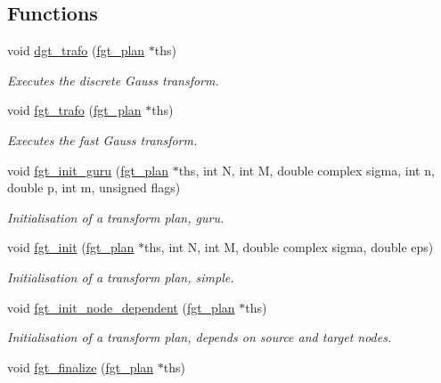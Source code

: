 \subsection*{Functions}
\begin{CompactItemize}
\item 
void \hyperlink{group__applications__fastgauss_ga0}{dgt\_\-trafo} (\hyperlink{structfgt__plan}{fgt\_\-plan} $\ast$ths)
\begin{CompactList}\small\item\em Executes the discrete Gauss transform. \item\end{CompactList}\item 
void \hyperlink{group__applications__fastgauss_ga1}{fgt\_\-trafo} (\hyperlink{structfgt__plan}{fgt\_\-plan} $\ast$ths)
\begin{CompactList}\small\item\em Executes the fast Gauss transform. \item\end{CompactList}\item 
void \hyperlink{group__applications__fastgauss_ga2}{fgt\_\-init\_\-guru} (\hyperlink{structfgt__plan}{fgt\_\-plan} $\ast$ths, int N, int M, double complex sigma, int n, double p, int m, unsigned flags)
\begin{CompactList}\small\item\em Initialisation of a transform plan, guru. \item\end{CompactList}\item 
void \hyperlink{group__applications__fastgauss_ga3}{fgt\_\-init} (\hyperlink{structfgt__plan}{fgt\_\-plan} $\ast$ths, int N, int M, double complex sigma, double eps)
\begin{CompactList}\small\item\em Initialisation of a transform plan, simple. \item\end{CompactList}\item 
void \hyperlink{group__applications__fastgauss_ga4}{fgt\_\-init\_\-node\_\-dependent} (\hyperlink{structfgt__plan}{fgt\_\-plan} $\ast$ths)
\begin{CompactList}\small\item\em Initialisation of a transform plan, depends on source and target nodes. \item\end{CompactList}\item 
void \hyperlink{group__applications__fastgauss_ga5}{fgt\_\-finalize} (\hyperlink{structfgt__plan}{fgt\_\-plan} $\ast$ths)

\end{CompactItemize}

